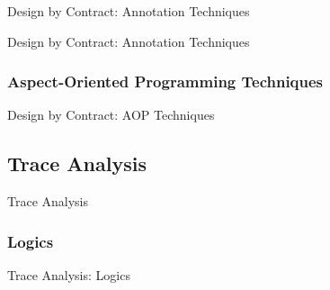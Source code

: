 \documentclass[12pt]{beamer}
\begin{document}
\begin{frame}{Design by Contract: Annotation Techniques}

\end{frame}

\begin{frame}{Design by Contract: Annotation Techniques}
\end{frame}

\subsubsection{Aspect-Oriented Programming Techniques}
\label{sec:runver-sbc-aop}

\begin{frame}{Design by Contract: AOP Techniques}

\end{frame}


\subsection{Trace Analysis}
\label{sec:runver-trace}

\begin{frame}{Trace Analysis}

\end{frame}

\subsubsection{Logics}
\label{sec:runver-trace-log}

\begin{frame}{Trace Analysis: Logics}

\end{frame}
\end{document}
